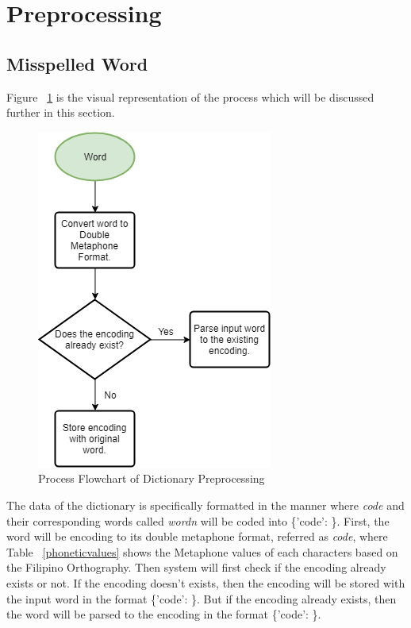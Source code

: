 \documentclass[12pt]{book}
\begin{document}
\section{Preprocessing}
\subsection{Misspelled Word}
Figure ~\ref{processflowchart_dict} is the visual representation of the process which will be discussed further in this section.

\begin{figure}
\begin{center}	
\includegraphics[scale=.60]{preprocessing_dict.png}
	\caption[Process Flowchart of Dictionary Preprocessing]
	{Process Flowchart of Dictionary Preprocessing}	
	\label{processflowchart_dict}
\end{center}
\end{figure}

The data of the dictionary is specifically formatted in the manner where \textit{code} and their corresponding words called \textit{wordn} will be coded into \{'code': \}. First, the word will be encoding to its double metaphone format, referred as \textit{code}, where Table ~\ref{phoneticvalues} shows the Metaphone values of each characters based on the Filipino Orthography. Then system will first check if the encoding already exists or not. If the encoding doesn't exists, then the encoding will be stored with the input word in the format  \{'code': \}. But if the encoding already exists, then the word will be parsed to the encoding in the format \{'code': \}.
\end{document}

